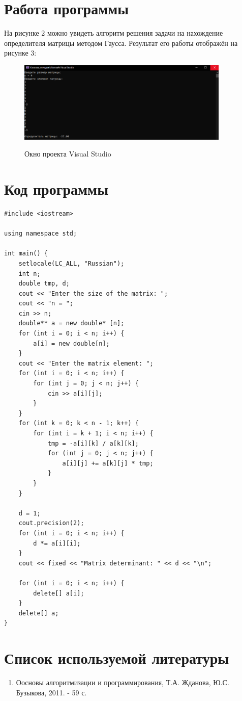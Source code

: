 \documentclass[14pt,a4paper]{scrartcl}
\begin{document}
\newpage
\section{Работа программы}
На рисунке 2 можно увидеть алгоритм решения задачи на нахождение определителя матрицы методом Гаусса. Результат его работы отображён на рисунке 3:

\begin{figure}[h!]
    \centering
    \includegraphics [width=0.9\textwidth]{pic3}\\
    \caption{Окно проекта Visual Studio}
    \label{fig:pic3}
\end{figure}
\section{Код программы}


\begin{lstlisting} 
#include <iostream>

using namespace std;

int main() {
    setlocale(LC_ALL, "Russian");
    int n;
    double tmp, d;
    cout << "Enter the size of the matrix: ";
    cout << "n = ";
    cin >> n;
    double** a = new double* [n];
    for (int i = 0; i < n; i++) {
        a[i] = new double[n];
    }
    cout << "Enter the matrix element: ";
    for (int i = 0; i < n; i++) {
        for (int j = 0; j < n; j++) {
            cin >> a[i][j];
        }
    }
    for (int k = 0; k < n - 1; k++) {
        for (int i = k + 1; i < n; i++) {
            tmp = -a[i][k] / a[k][k];
            for (int j = 0; j < n; j++) {
                a[i][j] += a[k][j] * tmp;
            }
        }
    }
    
    d = 1;
    cout.precision(2);
    for (int i = 0; i < n; i++) {
        d *= a[i][i];
    }
    cout << fixed << "Matrix determinant: " << d << "\n";

    for (int i = 0; i < n; i++) {
        delete[] a[i];
    }
    delete[] a;
}
\end{lstlisting}

\newpage
\section{Список используемой литературы}

\begin{enumerate}

    \item Оосновы алгоритмизации и программирования, Т.А. Жданова, Ю.С. Бузыкова, 2011. - 59 с.
\end{enumerate}
\end{document}
